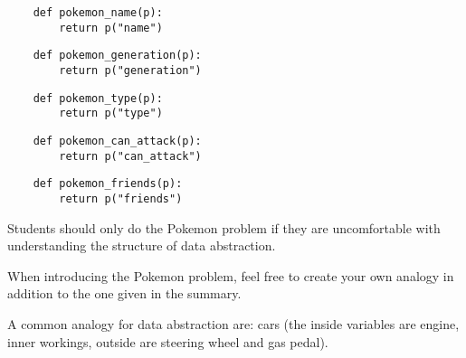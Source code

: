     \begin{blocksection}
    \begin{lstlisting}
    def pokemon_name(p):
        return p("name")
    \end{lstlisting}

    \end{blocksection}
    \begin{blocksection}
    
    \begin{lstlisting}
    def pokemon_generation(p):
        return p("generation")
    \end{lstlisting}

    \end{blocksection}
    \begin{blocksection}
    
    \begin{lstlisting}
    def pokemon_type(p):
        return p("type")
    \end{lstlisting}

    \end{blocksection}
    \begin{blocksection}

    \begin{lstlisting}
    def pokemon_can_attack(p):
        return p("can_attack")
    \end{lstlisting}

    \end{blocksection}
    \begin{blocksection}

    \begin{lstlisting}
    def pokemon_friends(p):
        return p("friends")
    \end{lstlisting}
    
    \end{blocksection}
    
    \begin{questionmeta}
        Students should only do the Pokemon problem if they are uncomfortable with understanding the structure of data abstraction.

        When introducing the Pokemon problem, feel free to create your own analogy in addition to the one given in the summary.

        A common analogy for data abstraction are: cars (the inside variables are engine, inner workings, outside are steering wheel and gas pedal).
    \end{questionmeta}